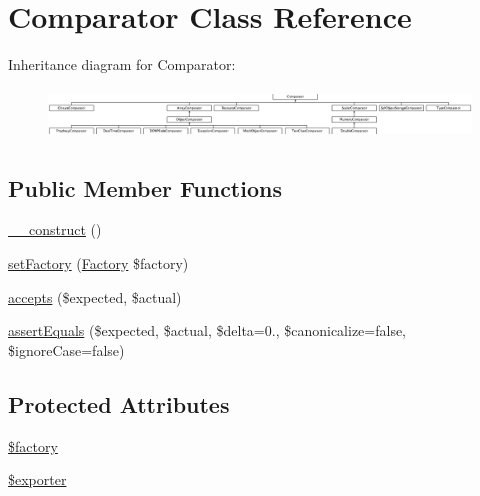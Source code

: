 \hypertarget{class_sebastian_bergmann_1_1_comparator_1_1_comparator}{}\section{Comparator Class Reference}
\label{class_sebastian_bergmann_1_1_comparator_1_1_comparator}
Inheritance diagram for Comparator\+:\begin{figure}[H]
\begin{center}
\leavevmode
\includegraphics[height=1.345345cm]{class_sebastian_bergmann_1_1_comparator_1_1_comparator}
\end{center}
\end{figure}
\subsection*{Public Member Functions}
\begin{DoxyCompactItemize}
\item 
\mbox{\hyperlink{class_sebastian_bergmann_1_1_comparator_1_1_comparator_a095c5d389db211932136b53f25f39685}{\+\_\+\+\_\+construct}} ()
\item 
\mbox{\hyperlink{class_sebastian_bergmann_1_1_comparator_1_1_comparator_acc7c763724e9827d616a324f69a211aa}{set\+Factory}} (\mbox{\hyperlink{class_sebastian_bergmann_1_1_comparator_1_1_factory}{Factory}} \$factory)
\item 
\mbox{\hyperlink{class_sebastian_bergmann_1_1_comparator_1_1_comparator_ae9bdf0cba02ce3470169280656cdeb84}{accepts}} (\$expected, \$actual)
\item 
\mbox{\hyperlink{class_sebastian_bergmann_1_1_comparator_1_1_comparator_adb3679ea06503114394431cb250ec5a4}{assert\+Equals}} (\$expected, \$actual, \$delta=0., \$canonicalize=false, \$ignore\+Case=false)
\end{DoxyCompactItemize}
\subsection*{Protected Attributes}
\begin{DoxyCompactItemize}
\item 
\mbox{\hyperlink{class_sebastian_bergmann_1_1_comparator_1_1_comparator_a099b374dc664ee043fffcd6ea05e3e70}{\$factory}}
\item 
\mbox{\hyperlink{class_sebastian_bergmann_1_1_comparator_1_1_comparator_af9b6401d3b379ed200e8fde8d4600523}{\$exporter}}
\end{DoxyCompactItemize}



